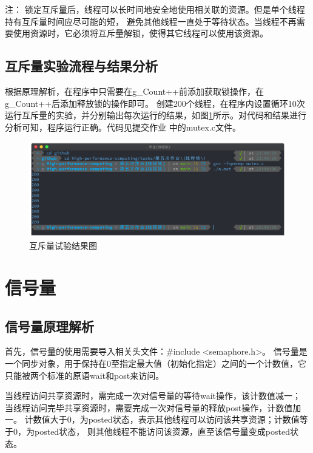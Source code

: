 \documentclass[11pt]{ctexart}
\newenvironment{note}{\kaishu 注：}{}
\begin{document}
\begin{note}
    锁定互斥量后，线程可以长时间地安全地使用相关联的资源。但是单个线程持有互斥量时间应尽可能的短，
    避免其他线程一直处于等待状态。当线程不再需要使用资源时，它必须将互斥量解锁，使得其它线程可以使用该资源。
\end{note}

\subsection{互斥量实验流程与结果分析}

根据原理解析，在程序中只需要在{\ttfamily g\_Count++}前添加获取锁操作，在{\ttfamily g\_Count++}后添加释放锁的操作即可。
创建200个线程，在程序内设置循环10次运行互斥量的实验，并分别输出每次运行的结果，如图\ref{mutex}所示。对代码和结果进行分析可知，程序运行正确。代码见提交作业
中的{\ttfamily mutex.c}文件。
 
\begin{figure}[ht]
    \centering
    \includegraphics[scale=0.35]{../mutex.png}
    \caption{互斥量试验结果图}
    \label{mutex}
\end{figure}

\section{信号量}

\subsection{信号量原理解析}

首先，信号量的使用需要导入相关头文件：{\ttfamily \#include <semaphore.h>}。
信号量是一个同步对象，用于保持在0至指定最大值（初始化指定）之间的一个计数值，它只能被两个标准的原语{\ttfamily wait}和{\ttfamily post}来访问。

当线程访问共享资源时，需完成一次对信号量的等待{\ttfamily wait}操作，该计数值减一；
当线程访问完毕共享资源时，需要完成一次对信号量的释放{\ttfamily post}操作，计数值加一。
计数值大于0，为{\ttfamily posted}状态，表示其他线程可以访问该共享资源；计数值等于0，为{\ttfamily posted}状态，
则其他线程不能访问该资源，直至该信号量变成{\ttfamily posted}状态。
\end{document}
